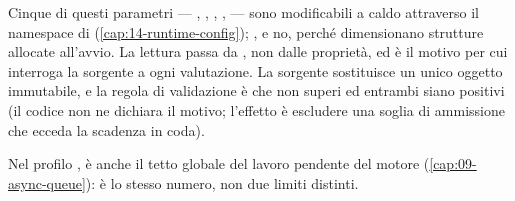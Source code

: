 Cinque di questi parametri --- , ,
, ,  ---
sono modificabili a caldo attraverso il namespace  di
 (\cref{cap:14-runtime-config}); ,
 e  no, perch\'e
dimensionano strutture allocate all'avvio. La lettura passa da
, non dalle propriet\`a, ed \`e il motivo per cui
 interroga la sorgente a ogni valutazione. La sorgente sostituisce
un unico oggetto immutabile, e la regola di validazione \`e che
 non superi  ed entrambi siano
positivi (il codice non ne dichiara il motivo; l'effetto \`e escludere una soglia
di ammissione che ecceda la scadenza in coda).

Nel profilo ,  \`e anche il tetto globale del
lavoro pendente del motore (\cref{cap:09-async-queue}): \`e lo stesso numero, non
due limiti distinti.
